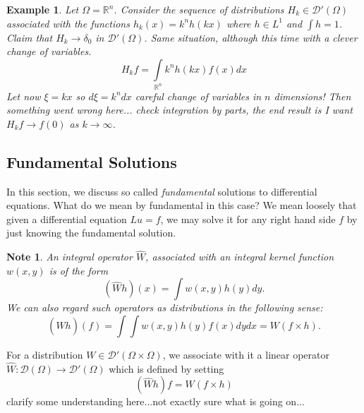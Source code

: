 \documentclass[letterpaper,twoside,11pt]{article}
\theoremstyle{mystyle}
\newtheorem*{ex}{Example}
\newtheorem*{note}{Note}
\newcommand{\R}{{\mathbb R}}
\newcommand{\DD}{\mathcal D}
\newcommand{\cg}{\color{gray}}
\newcommand{\cbk}{\color{black}}
\newcommand{\cred}{\color{red}}
\begin{document}
\begin{ex}
  Let $\Omega=\R^n$. Consider the sequence of distributions $H_k \in \DD'\left( \Omega \right)$ associated with the functions $h_k(x) = k^n h(kx)$ where $h \in L^1$ and $\int h = 1$. Claim that $H_k \to \delta_0$ in $\DD'(\Omega)$. 
  Same situation, although this time with a clever change of variables. 
  \[{H_k}f = \int\limits_{{\mathbb{R}^n}} {{k^n}h\left( {kx} \right)f\left( x \right)dx} \]
  Let now $\xi = kx$ so $d \xi = k^ndx$ \cg careful change of variables in $n$ dimensions! \cbk Then \cred something went wrong here... check integration by parts, the end result is I want $H_kf\to f(0)$ as $k \to \infty$. \cbk 
\end{ex}

\subsection{Fundamental Solutions}
In this section, we discuss so called \textit{fundamental} solutions to differential equations. What do we mean by fundamental in this case? We mean loosely that given a differential equation $Lu = f$, we may solve it for any right hand side $f$ by just knowing the fundamental solution. 

\begin{note}
  An integral operator $\hat W$, associated with an integral kernel function $w(x, y)$ is of the form 
  \[\left( {\hat Wh} \right)\left( x \right) = \int {w\left( {x,y} \right)h\left( y \right)dy} .\] 
  We can also regard such operators as distributions in the following sense:
  \[\left( {\hat Wh} \right)\left( f \right) = \int {\int {w\left( {x,y} \right)h\left( y \right)f\left( x \right)dydx} } = W\left( f\times h \right).\]
\end{note}
For a distribution $W\in \DD'\left( \Omega\times \Omega \right)$, we associate with it a linear operator $\hat W : \DD\left( \Omega \right) \to \DD'\left( \Omega \right)$ which is defined by setting
\[\left( \hat W h  \right)  f = W\left( f\times h \right)\]
\cred clarify some understanding here...not exactly sure what is going on...\cbk 
\end{document}
